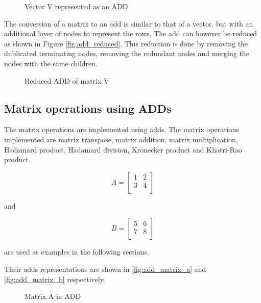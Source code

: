 \begin{figure*}
    \centering
    
    \caption{Vector V represented as an ADD}
    \label{fig:add}
\end{figure*}

The conversion of a matrix to an \gls{add} is similar to that of a vector, but with an additional layer of nodes to represent the rows.
The \gls{add} can however be reduced as shown in Figure \autoref{fig:add_reduced}.
This reduction is done by removing the dublicated terminating nodes, removing the redundant nodes and merging the nodes with the same children.

\begin{figure}
    \centering
    
    \caption{Reduced ADD of matrix V}
    \label{fig:add_reduced}
\end{figure}

\subsection{Matrix operations using ADDs}\label{subsec:matrix-operations-using-adds}
The matrix operations are implemented using \glspl{add}.
The matrix operations implemented are matrix transpose, matrix addition, matrix multiplication, Hadamard product, Hadamard division, Kronecker product and Khatri-Rao product.

\[
    A = \begin{bmatrix}
            1 & 2 \\
            3 & 4 \\
    \end{bmatrix}
\]

and

\[
    B = \begin{bmatrix}
            5 & 6 \\
            7 & 8 \\
    \end{bmatrix}
\]

are used as examples in the following sections.

Their \glspl{add} representations are shown in \autoref{fig:add_matrix_a} and \autoref{fig:add_matrix_b} respectively.

\begin{figure}
    \centering
    \caption{Matrix A in ADD}
    \label{fig:add_matrix_a}
\end{figure}

